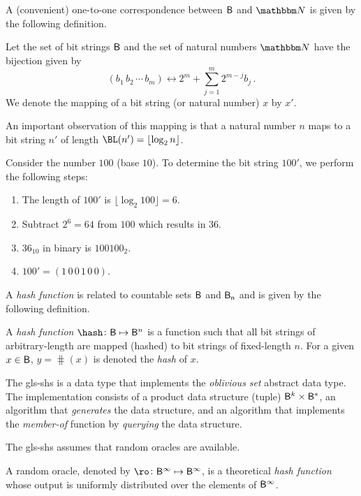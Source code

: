 \documentclass[ ../main.tex]{subfiles}
\begin{document}
A (convenient) one-to-one correspondence between $\Set{B}$ and $\NatSet$ is given by the following definition.
\begin{definition}
\label{def:mapping}
Let the set of bit strings $\Set{B}$ and the set of natural numbers $\NatSet$ have the bijection given by
\begin{equation}
    (b_1 \, b_2 \, \cdots \, b_m) \longleftrightarrow 2^m + \sum_{j=1}^{m} 2^{m - j} b_j\,.
\end{equation}
We denote the mapping of a bit string (or natural number) $x$ by $x'$.
\end{definition}
An important observation of this mapping is that a natural number $n$ maps to a bit string $n'$ of length $\BL(n') = \lfloor \log_2 n \rfloor$.
\begin{example}
Consider the number $100$ (base $10$). To determine the bit string $100'$, we perform the following steps:
\begin{enumerate}
    \item The length of $100'$ is $\lfloor \log_2 100 \rfloor = 6$.
    \item Subtract $2^6 = 64$ from $100$ which results in $36$.
    \item $36_{10}$ in binary is $100100_2$.
    \item $100' = (1\,0\,0\,1\,0\,0)$.
\end{enumerate}
\end{example}

A \emph{hash function} is related to countable sets $\Set{B}$ and $\Set{B}[n]$ and is given by the following definition.
\begin{definition}
A \emph{hash function} $\hash \colon \Set{B} \mapsto \Set{B}^n$ is a function such that all bit strings of arbitrary-length are mapped (hashed) to bit strings of fixed-length $n$. For a given $x \in \Set{B}$, $y = \hash(x)$ is denoted the \emph{hash} of $x$.
\end{definition}

The \gls{gls-shs} is a data type that implements the \emph{oblivious set} 
abstract data type. The implementation consists of a product data structure 
(tuple) $\Set{B}^k \times \Set{B}^{*}$, an algorithm that \emph{generates} the 
data structure, and an algorithm that implements the \emph{member-of} function 
by \emph{querying} the data structure. 

The \gls{gls-shs} assumes that random oracles are available.
\begin{definition}
\label{def:randomoracle}
A random oracle, denoted by $\ro \colon \Set{B}^\infty \mapsto \Set{B}^\infty$, is a theoretical \emph{hash function} whose output is uniformly distributed over the elements of $\Set{B}^\infty$.
\end{definition}
\end{document}
